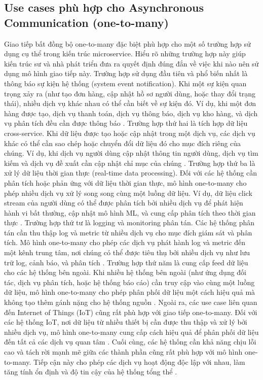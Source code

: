 \subsection{Use cases phù hợp cho Asynchronous Communication (one-to-many)}
Giao tiếp bất đồng bộ one-to-many đặc biệt phù hợp cho một số trường hợp sử dụng cụ thể trong kiến trúc microservice. Hiểu rõ những trường hợp này giúp kiến trúc sư và nhà phát triển đưa ra quyết định đúng đắn về việc khi nào nên sử dụng mô hình giao tiếp này.
Trường hợp sử dụng đầu tiên và phổ biến nhất là thông báo sự kiện hệ thống (system event notification). Khi một sự kiện quan trọng xảy ra (như tạo đơn hàng, cập nhật hồ sơ người dùng, hoặc thay đổi trạng thái), nhiều dịch vụ khác nhau có thể cần biết về sự kiện đó. Ví dụ, khi một đơn hàng được tạo, dịch vụ thanh toán, dịch vụ thông báo, dịch vụ kho hàng, và dịch vụ phân tích đều cần được thông báo \cite{newman2015}.
Trường hợp thứ hai là tích hợp dữ liệu cross-service. Khi dữ liệu được tạo hoặc cập nhật trong một dịch vụ, các dịch vụ khác có thể cần sao chép hoặc chuyển đổi dữ liệu đó cho mục đích riêng của chúng. Ví dụ, khi dịch vụ người dùng cập nhật thông tin người dùng, dịch vụ tìm kiếm và dịch vụ đề xuất cần cập nhật chỉ mục của chúng \cite{richardson2019}.
Trường hợp thứ ba là xử lý dữ liệu thời gian thực (real-time data processing). Đối với các hệ thống cần phân tích hoặc phản ứng với dữ liệu thời gian thực, mô hình one-to-many cho phép nhiều dịch vụ xử lý song song cùng một luồng dữ liệu. Ví dụ, dữ liệu click stream của người dùng có thể được phân tích bởi nhiều dịch vụ để phát hiện hành vi bất thường, cập nhật mô hình ML, và cung cấp phân tích theo thời gian thực \cite{goodhope2012}.
Trường hợp thứ tư là logging và monitoring phân tán. Các hệ thống phân tán cần thu thập log và metric từ nhiều dịch vụ cho mục đích giám sát và phân tích. Mô hình one-to-many cho phép các dịch vụ phát hành log và metric đến một kênh trung tâm, nơi chúng có thể được tiêu thụ bởi nhiều dịch vụ như lưu trữ log, cảnh báo, và phân tích \cite{aksakalli2021}.
Trường hợp thứ năm là cung cấp feed dữ liệu cho các hệ thống bên ngoài. Khi nhiều hệ thống bên ngoài (như ứng dụng đối tác, dịch vụ phân tích, hoặc hệ thống báo cáo) cần truy cập vào cùng một luồng dữ liệu, mô hình one-to-many cho phép phân phối dữ liệu một cách hiệu quả mà không tạo thêm gánh nặng cho hệ thống nguồn \cite{beyer2018}.
Ngoài ra, các use case liên quan đến Internet of Things (IoT) cũng rất phù hợp với giao tiếp one-to-many. Đối với các hệ thống IoT, nơi dữ liệu từ nhiều thiết bị cần được thu thập và xử lý bởi nhiều dịch vụ, mô hình one-to-many cung cấp cách hiệu quả để phân phối dữ liệu đến tất cả các dịch vụ quan tâm \cite{indrasiri2020}.
Cuối cùng, các hệ thống cần khả năng chịu lỗi cao và tách rời mạnh mẽ giữa các thành phần cũng rất phù hợp với mô hình one-to-many. Tiếp cận này cho phép các dịch vụ hoạt động độc lập với nhau, làm tăng tính ổn định và độ tin cậy của hệ thống tổng thể \cite{fowler2002}.
